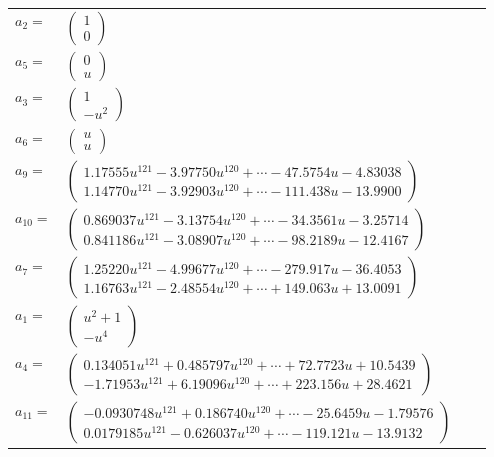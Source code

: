 \documentclass[1p]{elsarticle_modified}
\theoremstyle{definition}
\begin{document}
\begin{tabular}{m{7pt} m{180pt} m{7pt} m{180pt} }
\flushright $a_{2}=$&$\begin{pmatrix}1\\0\end{pmatrix}$ \\
\flushright $a_{5}=$&$\begin{pmatrix}0\\u\end{pmatrix}$ \\
\flushright $a_{3}=$&$\begin{pmatrix}1\\- u^2\end{pmatrix}$ \\
\flushright $a_{6}=$&$\begin{pmatrix}u\\u\end{pmatrix}$ \\
\flushright $a_{9}=$&$\begin{pmatrix}1.17555 u^{121}-3.97750 u^{120}+\cdots-47.5754 u-4.83038\\1.14770 u^{121}-3.92903 u^{120}+\cdots-111.438 u-13.9900\end{pmatrix}$ \\
\flushright $a_{10}=$&$\begin{pmatrix}0.869037 u^{121}-3.13754 u^{120}+\cdots-34.3561 u-3.25714\\0.841186 u^{121}-3.08907 u^{120}+\cdots-98.2189 u-12.4167\end{pmatrix}$ \\
\flushright $a_{7}=$&$\begin{pmatrix}1.25220 u^{121}-4.99677 u^{120}+\cdots-279.917 u-36.4053\\1.16763 u^{121}-2.48554 u^{120}+\cdots+149.063 u+13.0091\end{pmatrix}$ \\
\flushright $a_{1}=$&$\begin{pmatrix}u^2+1\\- u^4\end{pmatrix}$ \\
\flushright $a_{4}=$&$\begin{pmatrix}0.134051 u^{121}+0.485797 u^{120}+\cdots+72.7723 u+10.5439\\-1.71953 u^{121}+6.19096 u^{120}+\cdots+223.156 u+28.4621\end{pmatrix}$ \\
\flushright $a_{11}=$&$\begin{pmatrix}-0.0930748 u^{121}+0.186740 u^{120}+\cdots-25.6459 u-1.79576\\0.0179185 u^{121}-0.626037 u^{120}+\cdots-119.121 u-13.9132\end{pmatrix}$ \\

\end{tabular}
\end{document}
